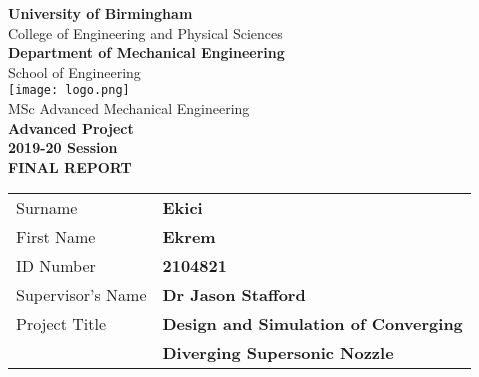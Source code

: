 \begin{titlepage}
	
	\begin{center}
		{\Large \textbf{University of Birmingham}}\\[0.25cm]
		{\Large College of Engineering and Physical Sciences}\\[0.5cm]
		{\Large \textbf{Department of Mechanical Engineering}}\\[0.25cm]
		{\Large School of Engineering}\\[0.5cm]
		\texttt{[image: logo.png]}\\[0.5cm]
		\linespread{1}
		{\LARGE MSc Advanced Mechanical Engineering}\\[1.25cm]
		{\LARGE \textbf{Advanced Project}}\\[1.25cm]
		{\Large\bf 2019-20 Session}\\[1.25cm]		
		{\LARGE\bf FINAL REPORT}\\[0.75cm]
	\end{center}
	\FloatBarrier
	\begin{table}[htb!]
		\begin{tabular}{ll}
			{\Large Surname}    & {\Large \textbf{Ekici}}              \\[3ex]
			{\Large First Name} & {\Large \textbf{Ekrem}}              \\[3ex]
			{\Large ID Number}  & {\Large \textbf{2104821}}            \\[3ex]
			{\Large Supervisor's Name} & {\Large \textbf{Dr Jason Stafford}}          \\[3ex]
			{\Large Project Title}     & {\Large \textbf{Design and Simulation of Converging}}\\[1.5ex]
			     & {\Large \textbf{Diverging Supersonic Nozzle}}\\
		\end{tabular}
	\end{table}
	\FloatBarrier
	\afterpage{\blankpage}
\end{titlepage}


